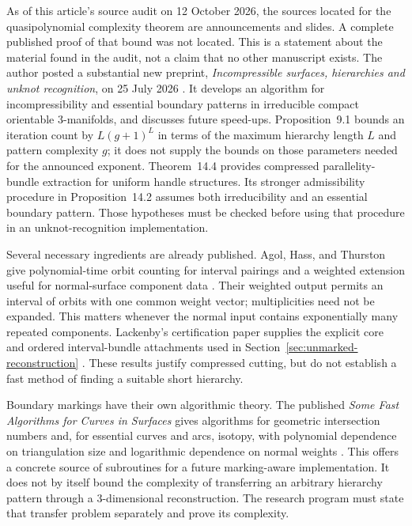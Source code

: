 As of this article's source audit on 12 October 2026, the sources located for
the quasipolynomial complexity theorem are announcements and slides.  A
complete published proof of that bound was not located.  This is a statement
about the material found in the audit, not a claim that no other manuscript
exists.  The author posted a substantial new preprint,
\emph{Incompressible surfaces, hierarchies and unknot recognition}, on
25 July 2026 \cite{Lackenby2026Hierarchies}.  It develops an algorithm for
incompressibility and essential boundary patterns in irreducible compact
orientable $3$-manifolds, and discusses future speed-ups.  Proposition~9.1
bounds an iteration count by $L(g+1)^L$ in terms of the maximum hierarchy
length $L$ and pattern complexity $g$; it does not supply the bounds on those
parameters needed for the announced exponent.  Theorem~14.4 provides
compressed parallelity-bundle extraction for uniform handle structures.
Its stronger admissibility procedure in Proposition~14.2 assumes both
irreducibility and an essential boundary pattern.  Those hypotheses must be
checked before using that procedure in an unknot-recognition implementation.

Several necessary ingredients are already published.  Agol, Hass, and
Thurston give polynomial-time orbit counting for interval pairings and a
weighted extension useful for normal-surface component data
\cite{AgolHassThurston2006}.  Their weighted output permits an interval of
orbits with one common weight vector; multiplicities need not be expanded.
This matters whenever the normal input contains exponentially many repeated
components.  Lackenby's certification paper supplies the explicit core and
ordered interval-bundle attachments used in
Section~\ref{sec:unmarked-reconstruction}
\cite{Lackenby2021Certification}.  These results justify compressed cutting,
but do not establish a fast method of finding a suitable short hierarchy.

Boundary markings have their own algorithmic theory.  The published
\emph{Some Fast Algorithms for Curves in Surfaces} gives algorithms for
geometric intersection numbers and, for essential curves and arcs, isotopy,
with polynomial dependence on triangulation size and logarithmic dependence
on normal weights \cite{Lackenby2026Curves}.  This offers a concrete source of
subroutines for a future marking-aware implementation.  It does not by itself
bound the complexity of transferring an arbitrary hierarchy pattern through
a $3$-dimensional reconstruction.  The research program must state that
transfer problem separately and prove its complexity.
